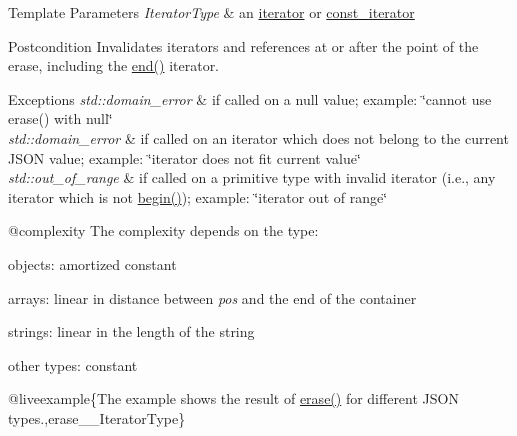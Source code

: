 \begin{DoxyTemplParams}{Template Parameters}
{\em Iterator\+Type} & an \mbox{\hyperlink{classnlohmann_1_1basic__json_a099316232c76c034030a38faa6e34dca}{iterator}} or \mbox{\hyperlink{classnlohmann_1_1basic__json_a41a70cf9993951836d129bb1c2b3126a}{const\+\_\+iterator}}\\
\hline
\end{DoxyTemplParams}
\begin{DoxyPostcond}{Postcondition}
Invalidates iterators and references at or after the point of the erase, including the {\ttfamily \mbox{\hyperlink{classnlohmann_1_1basic__json_a13e032a02a7fd8a93fdddc2fcbc4763c}{end()}}} iterator.
\end{DoxyPostcond}

\begin{DoxyExceptions}{Exceptions}
{\em std\+::domain\+\_\+error} & if called on a {\ttfamily null} value; example\+: {\ttfamily \char`\"{}cannot
use erase() with null\char`\"{}} \\
\hline
{\em std\+::domain\+\_\+error} & if called on an iterator which does not belong to the current J\+S\+ON value; example\+: {\ttfamily \char`\"{}iterator does not fit current value\char`\"{}} \\
\hline
{\em std\+::out\+\_\+of\+\_\+range} & if called on a primitive type with invalid iterator (i.\+e., any iterator which is not {\ttfamily \mbox{\hyperlink{classnlohmann_1_1basic__json_a0ff28dac23f2bdecee9564d07f51dcdc}{begin()}}}); example\+: {\ttfamily \char`\"{}iterator
out of range\char`\"{}}\\
\hline
\end{DoxyExceptions}
@complexity The complexity depends on the type\+:
\begin{DoxyItemize}
\item objects\+: amortized constant
\item arrays\+: linear in distance between {\itshape pos} and the end of the container
\item strings\+: linear in the length of the string
\item other types\+: constant
\end{DoxyItemize}

@liveexample\{The example shows the result of {\ttfamily \mbox{\hyperlink{classnlohmann_1_1basic__json_a068a16e76be178e83da6a192916923ed}{erase()}}} for different J\+S\+ON types.,erase\+\_\+\+\_\+\+Iterator\+Type\}

